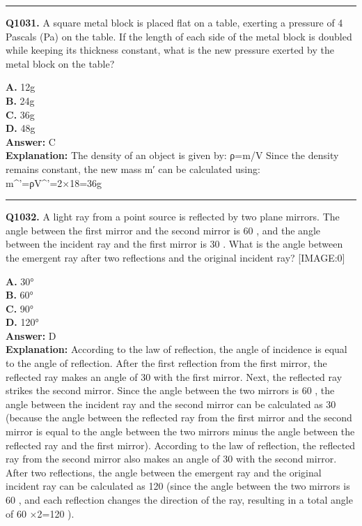 \documentclass[12pt]{article}
\begin{document}
\hrule
\vspace{1em}


\noindent
\textbf{Q1031.} A square metal block is placed flat on a table, exerting a pressure of 4 Pascals (Pa) on the table. If the length of each side of the metal block is doubled while keeping its thickness constant, what is the new pressure exerted by the metal block on the table?



\textbf{A.} 12g \\
\textbf{B.} 24g \\
\textbf{C.} 36g \\
\textbf{D.} 48g \\

\textbf{Answer:} C \\
\textbf{Explanation:} The density of an object is given by: ρ=m/V Since the density remains constant, the new mass m′ can be calculated using: m^'=ρ\cdot V^'=2×18=36g

\hrule
\vspace{1em}


\noindent
\textbf{Q1032.} A light ray from a point source is reflected by two plane mirrors. The angle between the first mirror and the second mirror is 60
\circ 
, and the angle between the incident ray and the first mirror is 30
\circ 
. What is the angle between the emergent ray after two reflections and the original incident ray?
[IMAGE:0]



\textbf{A.} 30° \\
\textbf{B.} 60° \\
\textbf{C.} 90° \\
\textbf{D.} 120° \\

\textbf{Answer:} D \\
\textbf{Explanation:} According to the law of reflection, the angle of incidence is equal to the angle of reflection. After the first reflection from the first mirror, the reflected ray makes an angle of 30
\circ 
with the first mirror.
Next, the reflected ray strikes the second mirror. Since the angle between the two mirrors is 60
\circ 
, the angle between the incident ray and the second mirror can be calculated as 30
\circ 
(because the angle between the reflected ray from the first mirror and the second mirror is equal to the angle between the two mirrors minus the angle between the reflected ray and the first mirror).
According to the law of reflection, the reflected ray from the second mirror also makes an angle of 30
\circ 
with the second mirror. After two reflections, the angle between the emergent ray and the original incident ray can be calculated as 120
\circ 
(since the angle between the two mirrors is 60
\circ 
, and each reflection changes the direction of the ray, resulting in a total angle of 60
\circ 
×2=120
\circ 
).
\end{document}

